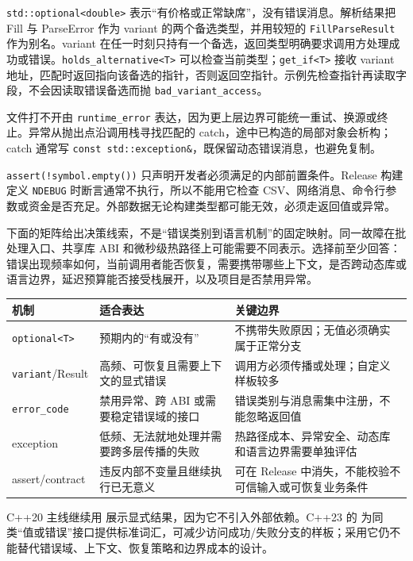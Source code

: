 \texttt{std::optional<double>} 表示“有价格或正常缺席”，没有错误消息。解析结果把 Fill 与 ParseError 作为 variant 的两个备选类型，并用较短的 \texttt{FillParseResult} 作为别名。variant 在任一时刻只持有一个备选，返回类型明确要求调用方处理成功或错误。\texttt{holds\_alternative<T>} 可以检查当前类型；\texttt{get\_if<T>} 接收 variant 地址，匹配时返回指向该备选的指针，否则返回空指针。示例先检查指针再读取字段，不会因读取错误备选而抛 \texttt{bad\_variant\_access}。

文件打不开由 \texttt{runtime\_error} 表达，因为更上层边界可能统一重试、换源或终止。异常从抛出点沿调用栈寻找匹配的 catch，途中已构造的局部对象会析构；catch 通常写 \texttt{const std::exception\&}，既保留动态错误消息，也避免复制。

\texttt{assert(!symbol.empty())} 只声明开发者必须满足的内部前置条件。Release 构建定义 \texttt{NDEBUG} 时断言通常不执行，所以不能用它检查 CSV、网络消息、命令行参数或资金是否充足。外部数据无论构建类型都可能无效，必须走返回值或异常。

下面的矩阵给出决策线索，不是“错误类别到语言机制”的固定映射。同一故障在批处理入口、共享库 ABI 和微秒级热路径上可能需要不同表示。选择前至少回答：错误出现频率如何，当前调用者能否恢复，需要携带哪些上下文，是否跨动态库或语言边界，延迟预算能否接受栈展开，以及项目是否禁用异常。

\begin{center}
\small
\begin{tabularx}{\textwidth}{p{}X X}
\toprule
机制 & 适合表达 & 关键边界 \\
\midrule
\texttt{optional<T>} & 预期内的“有或没有” & 不携带失败原因；无值必须确实属于正常分支 \\
\texttt{variant}/Result & 高频、可恢复且需要上下文的显式错误 & 调用方必须传播或处理；自定义样板较多 \\
\texttt{error\_code} & 禁用异常、跨 ABI 或需要稳定错误域的接口 & 错误类别与消息需集中注册，不能忽略返回值 \\
exception & 低频、无法就地处理并需要跨多层传播的失败 & 热路径成本、异常安全、动态库和语言边界需要单独评估 \\
assert/contract & 违反内部不变量且继续执行已无意义 & 可在 Release 中消失，不能校验不可信输入或可恢复业务条件 \\
\bottomrule
\end{tabularx}
\end{center}

C++20 主线继续用  展示显式结果，因为它不引入外部依赖。C++23 的  为同类“值或错误”接口提供标准词汇，可减少访问成功/失败分支的样板；采用它仍不能替代错误域、上下文、恢复策略和边界成本的设计。

